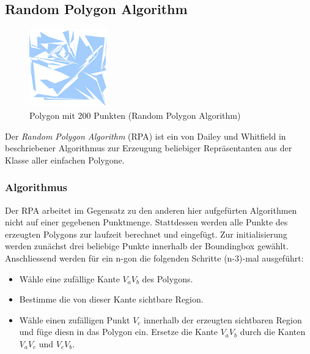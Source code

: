 \subsection{Random Polygon Algorithm} %

\begin{figure}[h]
\begin{center}
\includegraphics[width=0.3\textwidth]{img/rpa200.eps}
\end{center}
\caption{Polygon mit 200 Punkten (Random Polygon Algorithm)}
\label{fig:virmani200}
\end{figure}

\label{sub:random_polygon_algorithm}

  Der \textit{Random Polygon Algorithm} (RPA) ist ein von Dailey und
  Whitfield in~\cite{dailey08rpa} beschriebener Algorithmus zur Erzeugung
  beliebiger Repräsentanten aus der Klasse aller einfachen Polygone.

  \subsubsection{Algorithmus} %
  \label{ssub:algorithmus}

    Der RPA arbeitet im Gegensatz zu den anderen hier aufgefürten
    Algorithmen nicht auf einer gegebenen Punktmenge. Stattdessen werden
    alle Punkte des erzeugten Polygons zur laufzeit berechnet und
    eingefügt. Zur initialisierung werden zunächst drei beliebige Punkte
    innerhalb der Boundingbox gewählt. Anschliessend werden für ein n-gon
    die folgenden Schritte (n-3)-mal ausgeführt:

    \begin{itemize}
      \item Wähle eine zufällige Kante $V_aV_b$ des Polygons.
      \item Bestimme die von dieser Kante sichtbare Region.
      \item Wähle einen zufälligen Punkt $V_c$ innerhalb der 
            erzeugten sichtbaren Region und füge diesn in das 
            Polygon ein. Ersetze die Kante $V_aV_b$ durch die Kanten 
            $V_aV_c$ und $V_cV_b$.
    \end{itemize}

